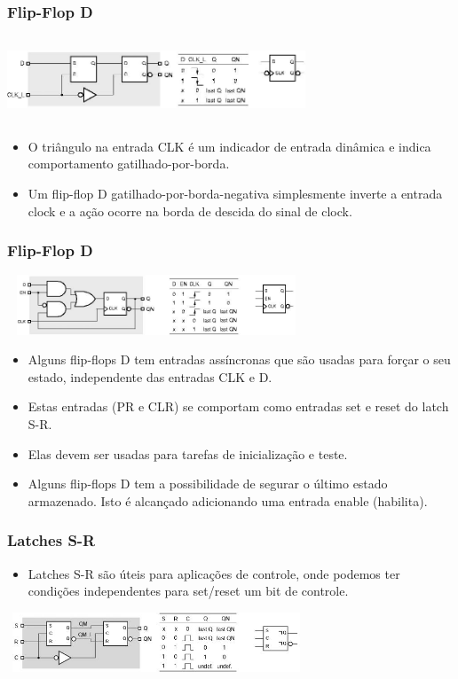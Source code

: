\documentclass{beamer}
\begin{document}
\begin{frame}
  \frametitle{Flip-Flop D}
 \begin{center}
  \includegraphics[height = 1in, width = 3.5in]{slide23_filomeno}
 \end{center}
 \begin{itemize}
  \item O triângulo na entrada CLK é um indicador de entrada dinâmica e indica comportamento gatilhado-por-borda.\pause
  \item Um flip-flop D gatilhado-por-borda-negativa simplesmente inverte a entrada clock e a ação ocorre na borda de descida do sinal de clock.
 \end{itemize}
\end{frame}

\begin{frame}
  \frametitle{Flip-Flop D}
 \begin{center}
  \includegraphics[height = 0.7in, width = 3.5in]{slide24_filomeno}
 \end{center}
 \begin{itemize}
  \item Alguns flip-flops D tem entradas assíncronas que são usadas para forçar o seu estado, independente das entradas CLK e D.\pause
  \item Estas entradas (PR e CLR) se comportam como entradas set e reset do latch S-R.\pause
  \item Elas devem ser usadas para tarefas de inicialização e teste.\pause
  \item Alguns flip-flops D tem a possibilidade de segurar o último estado armazenado. Isto é alcançado adicionando uma entrada enable (habilita).
 \end{itemize}
\end{frame}

\begin{frame}
  \frametitle{Latches S-R}
 \begin{itemize}
  \item Latches S-R são úteis para aplicações de controle, onde podemos ter condições independentes para set/reset um bit de controle.
 \end{itemize}
 \begin{center}
  \includegraphics[height = 0.7in, width = 3.5in]{slide25_filomeno}
 \end{center} 
\end{frame}
\end{document}

